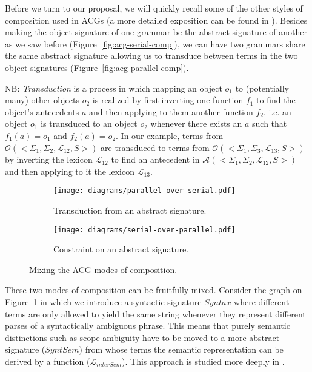 Before we turn to our proposal, we will quickly recall some of the other
styles of composition used in ACGs (a more detailed exposition can be
found in \cite{pogodalla2012controlling}). Besides making the object
signature of one grammar be the abstract signature of another as we saw
before (Figure~\ref{fig:acg-serial-comp}), we can have two grammars
share the same abstract signature allowing us to transduce between terms
in the two object signatures (Figure~\ref{fig:acg-parallel-comp}).

NB: \emph{Transduction} is a process in which mapping an object $o_1$ to
(potentially many) other objects $o_2$ is realized by first inverting
one function $f_1$ to find the object's antecedents $a$ and then
applying to them another function $f_2$, i.e. an object $o_1$ is
transduced to an object $o_2$ whenever there exists an $a$ such that
$f_1(a) = o_1$ and $f_2(a) = o_2$. In our example, terms from
$\mathcal{O}( \mathopen{<} \Sigma_1, \Sigma_2, \mathcal{L}_{12}, S
\mathclose{>} )$ are transduced to terms from $\mathcal{O}( \mathopen{<}
\Sigma_1, \Sigma_3, \mathcal{L}_{13}, S \mathclose{>} )$ by inverting
the lexicon $\mathcal{L}_{12}$ to find an antecedent in $\mathcal{A}(
\mathopen{<} \Sigma_1, \Sigma_2, \mathcal{L}_{12}, S \mathclose{>} )$
and then applying to it the lexicon $\mathcal{L}_{13}$.

\begin{figure}[t]
  \centering
  \begin{subfigure}[b]{0.4\textwidth}
    \centering
    \texttt{[image: diagrams/parallel-over-serial.pdf]}
    \caption{\label{fig:parallel-over-serial} Transduction from an
      abstract signature.}
  \end{subfigure}
  \qquad
  \begin{subfigure}[b]{0.4\textwidth}
    \centering
    \texttt{[image: diagrams/serial-over-parallel.pdf]}
    \caption{\label{fig:serial-over-parallel} Constraint on an abstract
      signature.}
  \end{subfigure}
  \caption{\label{fig:acg-comp-patterns} Mixing the ACG modes of
    composition.}
\end{figure}

These two modes of composition can be fruitfully mixed. Consider the
graph on Figure~\ref{fig:parallel-over-serial} in which we introduce a
syntactic signature $Syntax$ where different terms are only allowed to
yield the same string whenever they represent different parses of a
syntactically ambiguous phrase. This means that purely semantic
distinctions such as scope ambiguity have to be moved to a more abstract
signature ($SyntSem$) from whose terms the semantic representation can
be derived by a function ($\mathcal{L}_{interSem}$). This approach is
studied more deeply in \cite{pogodalla2007generalizing}.

